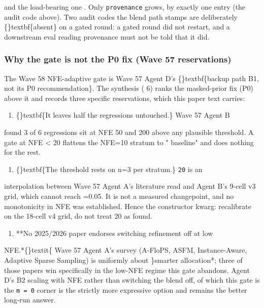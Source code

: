 \documentclass{article}
\begin{document}
 and  the load-bearing one  . Only \texttt{provenance} grows, by exactly one entry (the audit code above). Two audit codes the blend path stamps are deliberately \{\}textbf\{absent\} on a gated round: a gated round did not restart, and a downstream eval reading provenance must not be told that it did.

\subsubsection{Why the gate is not the P0 fix (Wave 57 reservations)}
The Wave 58 NFE-adaptive gate is Wave 57 Agent D's \{\}textbf\{backup path B1, not its P0 recommendation\}. The synthesis ( 6) ranks the masked-prior fix (P0) above it and records three specific reservations, which this paper text carries:

\begin{enumerate}
\item \{\}textbf\{It leaves half the regressions untouched.\} Wave 57 Agent B
\end{enumerate}
found 3 of 6 regressions sit at NFE 50 and 200  above any plausible threshold. A gate at NFE < 20 flattens the NFE=10 stratum to " baseline" and does nothing for the rest.

\begin{enumerate}
\item \{\}textbf\{The threshold rests on n=3 per stratum.\} \texttt{20} is an
\end{enumerate}
interpolation between Wave 57 Agent A's literature read and Agent B's 9-cell v3 grid, which cannot reach =0.05. It is not a measured changepoint, and no monotonicity in NFE was established. Hence the constructor kwarg: recalibrate on the 18-cell v4 grid, do not treat 20 as found.

\begin{enumerate}
\item **No 2025/2026 paper endorses switching refinement off at low
\end{enumerate}
NFE.*\{\}textit\{ Wave 57 Agent A's survey (A-FloPS, ASFM, Instance-Aware, Adaptive Sparse Sampling) is uniformly about \}smarter allocation*; three of those papers win specifically in the low-NFE regime this gate abandons. Agent D's B2  scaling  with NFE rather than switching the blend off, of which this gate is the \texttt{m = 0} corner  is the strictly more expressive option and remains the better long-run answer.
\end{document}
